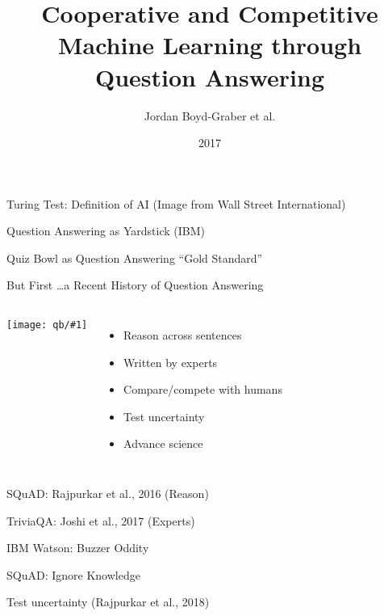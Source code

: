 \documentclass[xcolor=dvipsnames]{beamer}
\title[HCQA]{Cooperative and Competitive Machine Learning through Question Answering}
\author{ Jordan Boyd-Graber et al.}
\date{2017}
\institute[Maryland] %
{University of Maryland}
\newcommand{\fsi}[2]{
\begin{frame}[plain]
\vspace*{-1pt}
\makebox[\linewidth]{\texttt{[image: \#1]}}
\begin{center}
#2
\end{center}
\end{frame}
}
\newcommand{\gfxq}[2]{
\begin{center}
	\texttt{[image: qb/\#1]}
\end{center}
}
\begin{document}
\frame{
\titlepage
\tiny
}

\fsi{qb/turing}{Turing Test: Definition of AI (Image from Wall Street
  International)}

\fsi{qb/jeopardy}{Question Answering as Yardstick (IBM)}

\fsi{qb/jennings_handshake}{Quiz Bowl as Question Answering ``Gold Standard''}

\begin{frame}{But First \dots a Recent History of Question Answering}

\begin{columns}
\gfxq{siri}{.8}
\begin{itemize}
  \item Reason across sentences
  \item Written by experts
  \item Compare/compete with humans
  \item Test uncertainty
  \item Advance science
\end{itemize}
\end{columns}

\end{frame}

\fsi{qb/squad}{SQuAD: Rajpurkar et al., 2016 (Reason)}

\fsi{qb/triviaqa}{TriviaQA: Joshi et al., 2017 (Experts)}

\fsi{qb/jeopardy}{IBM Watson: Buzzer Oddity}

\fsi{qb/human_reading}{SQuAD: Ignore Knowledge}

\fsi{qb/squad_2}{Test uncertainty (Rajpurkar et al., 2018)}
\end{document}
